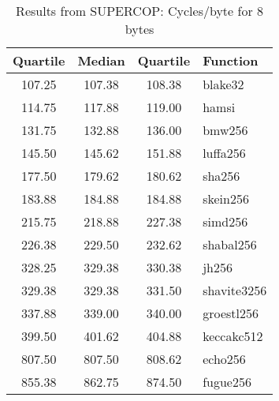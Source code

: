 \begin{table}
  \centering
  \caption{Results from SUPERCOP: Cycles/byte for 8 bytes}
  \begin{tabular}{ | c | c | c | l | }
    \hline
    \textbf{Quartile} & \textbf{Median} & \textbf{Quartile} & \textbf{Function} \\ \hline
    107.25 & 107.38 & 108.38 & blake32 \\ \hline
    114.75 & 117.88 & 119.00 & hamsi \\ \hline
    131.75 & 132.88 & 136.00 & bmw256 \\ \hline
    145.50 & 145.62 & 151.88 & luffa256 \\ \hline
    177.50 & 179.62 & 180.62 & sha256 \\ \hline
    183.88 & 184.88 & 184.88 & skein256 \\ \hline
    215.75 & 218.88 & 227.38 & simd256 \\ \hline
    226.38 & 229.50 & 232.62 & shabal256 \\ \hline
    328.25 & 329.38 & 330.38 & jh256 \\ \hline
    329.38 & 329.38 & 331.50 & shavite3256 \\ \hline
    337.88 & 339.00 & 340.00 & groestl256 \\ \hline
    399.50 & 401.62 & 404.88 & keccakc512 \\ \hline
    807.50 & 807.50 & 808.62 & echo256 \\ \hline
    855.38 & 862.75 & 874.50 & fugue256 \\ \hline
  \end{tabular}
  \label{tbl:supercop:8}
\end{table}
